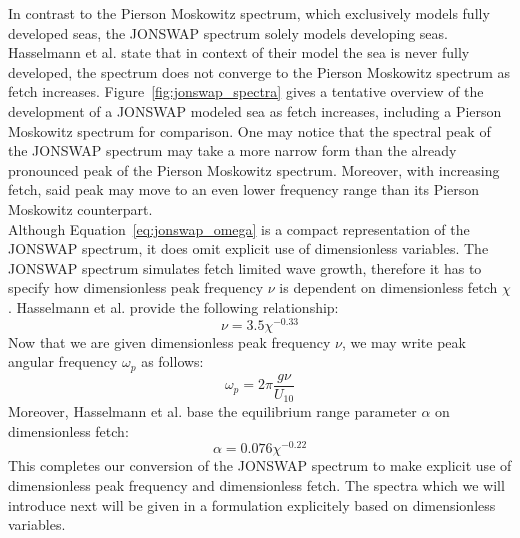 In contrast to the Pierson Moskowitz spectrum, which exclusively models fully 
developed seas, the JONSWAP spectrum solely models developing seas. Hasselmann 
et al. state that in context of their model the sea is never fully developed, 
the spectrum does not converge to the Pierson Moskowitz spectrum as fetch 
increases. Figure~\ref{fig:jonswap_spectra} gives a tentative overview of the 
development of a JONSWAP modeled sea as fetch increases, including a Pierson 
Moskowitz spectrum for comparison. One may notice that the spectral peak of the 
JONSWAP spectrum may take a more narrow form than the already pronounced peak of 
the Pierson Moskowitz spectrum. Moreover, with increasing fetch, said peak may 
move to an even lower frequency range than its Pierson Moskowitz counterpart.\\

Although Equation~\ref{eq:jonswap_omega} is a compact representation of the
JONSWAP spectrum, it does omit explicit use of dimensionless variables.
The JONSWAP spectrum simulates fetch limited wave growth, therefore it has to
specify how dimensionless peak frequency $\nu$ is dependent on dimensionless
fetch $\chi$. Hasselmann et al. provide the following relationship:
\begin{equation}
\label{eq:jonswap_nu}
 \nu = 3.5\chi^{-0.33}
\end{equation}
Now that we are given dimensionless peak frequency $\nu$, we may write peak
angular frequency $\omega_p$ as follows:
\begin{equation}
 \omega_p = 2\pi\frac{g\nu}{U_{10}}
\end{equation}
Moreover, Hasselmann et al. base the equilibrium range parameter $\alpha$ on
dimensionless fetch:
\begin{equation}
 \alpha = 0.076 \chi^{-0.22}
\end{equation}
%
This completes our conversion of the JONSWAP spectrum to make explicit use of 
dimensionless peak frequency and dimensionless fetch. The spectra which we will
introduce next will be given in a formulation explicitely based on dimensionless
variables.
%
